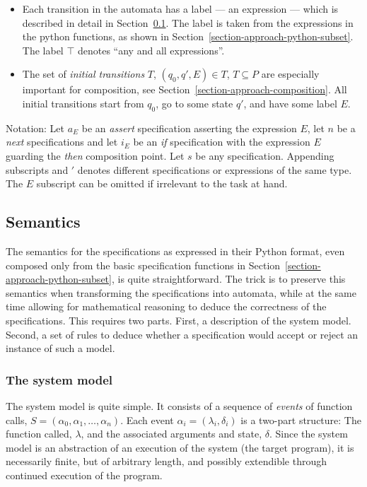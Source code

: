 \documentclass[a4paper,11pt]{kth-mag}
\begin{document}
\begin{itemize}
  \item Each transition in the automata has a label --- an expression --- which
    is described in detail in Section~\ref{section-approach-semantics}. The
    label is taken from the expressions in the python functions, as shown in
    Section~\ref{section-approach-python-subset}. The label $\top$ denotes ``any
    and all expressions''.

  \item The set of \textit{initial transitions} $T$, $(q_0, q', E) \in T$, $T
    \subseteq P$ are especially important for composition, see
    Section~\ref{section-approach-composition}. All initial transitions start
    from $q_0$, go to some state $q'$, and have some label $E$.
\end{itemize}

Notation: Let $a_E$ be an \textit{assert} specification asserting the
expression $E$, let $n$ be a \textit{next} specifications and let $i_E$ be an
\textit{if} specification with the expression $E$ guarding the \textit{then}
composition point. Let $s$ be any specification. Appending subscripts and $'$
denotes different specifications or expressions of the same type. The $E$
subscript can be omitted if irrelevant to the task at hand.


\subsection{Semantics} \label{section-approach-semantics}

The semantics for the specifications as expressed in their Python format, even
composed only from the basic specification functions in
Section~\ref{section-approach-python-subset}, is quite straightforward. The
trick is to preserve this semantics when transforming the specifications into
automata, while at the same time allowing for mathematical reasoning to deduce
the correctness of the specifications. This requires two parts. First, a
description of the system model. Second, a set of rules to deduce whether a
specification would accept or reject an instance of such a model.


\subsubsection{The system model}

The system model is quite simple. It consists of a sequence of \textit{events}
of function calls, $S = (\alpha_0, \alpha_1, \dots, \alpha_n)$. Each event
$\alpha_i = (\lambda_i, \delta_i)$ is a two-part structure: The function
called, $\lambda$, and the associated arguments and state, $\delta$. Since the
system model is an abstraction of an execution of the system (the target
program), it is necessarily finite, but of arbitrary length, and possibly
extendible through continued execution of the program.
\end{document}
